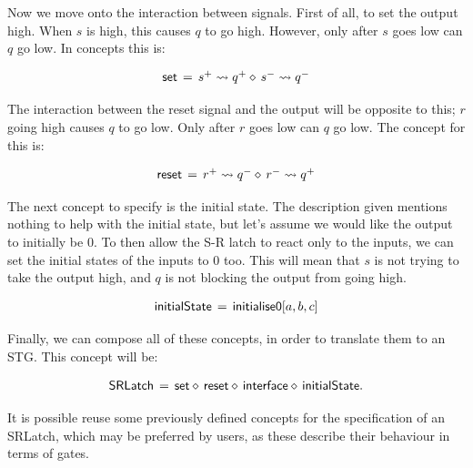 \documentclass[british, journal]{IEEEtran}
\begin{document}
Now we move onto the interaction between signals. First of all, to set the output high.
When $s$ is high, this causes $q$ to go high. However, only after $s$ goes low can $q$ go low.
In concepts this is: 

\[
\begin{array}{lcl}
\mathsf{set}&\hspace{-2mm}=&\hspace{-2mm}s^{+} \rightsquigarrow q^{+} \diamond\, s^{-} \rightsquigarrow q^{-}
\end{array}
\]

The interaction between the reset signal and the output will be opposite to this; $r$ going high causes $q$ 
to go low. Only after $r$ goes low can $q$ go low. The concept for this is:

\[
\begin{array}{lcl}
\mathsf{reset}&\hspace{-2mm}=&\hspace{-2mm}r^{+} \rightsquigarrow q^{-} \diamond\, r^{-} \rightsquigarrow q^{+}
\end{array}
\]

The next concept to specify is the initial state. The description given mentions nothing
to help with the initial state, but let's assume we would like the output to initially be 0. 
To then allow the S-R latch to react only to the inputs, we can set the initial states of the 
inputs to 0 too. This will mean that $s$ is not trying to take the output high, and $q$ is not
blocking the output from going high. 

\[
\begin{array}{lcl}
\mathsf{initialState}&\hspace{-2mm}=&\hspace{-2mm}\mathsf{initialise0} [a, b, c]
\end{array}
\]

Finally, we can compose all of these concepts, in order to translate them to an STG. This concept will be:

\[
\begin{array}{lcl}
\mathsf{SRLatch}&\hspace{-2mm}=&\hspace{-2mm}\mathsf{set} \diamond\, \mathsf{reset} \diamond\, \mathsf{interface} 
\diamond\, \mathsf{initialState}.
\end{array}
\]

It is possible reuse some previously defined concepts for the specification of an SRLatch,
which may be preferred by users, as these describe their behaviour in terms of gates.  
\end{document}

